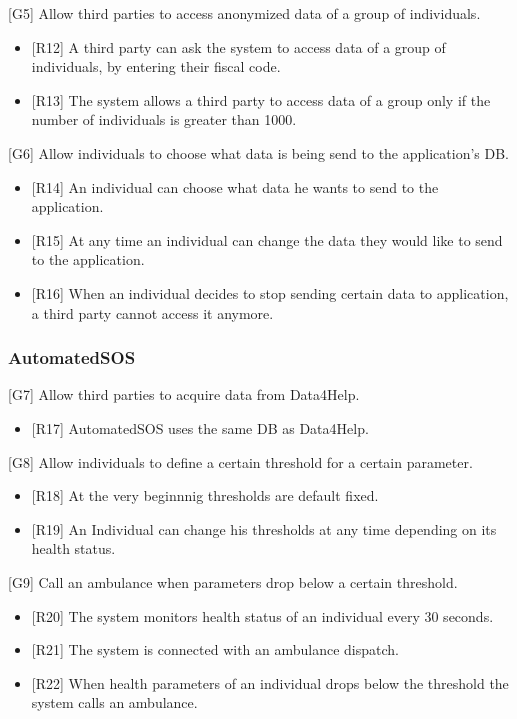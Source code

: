 \documentclass[12pt]{article}
\begin{document}
[G5] Allow third parties to access anonymized data of a group of individuals.\newline 
\begin{itemize}
    \item {[R12]} A third party can ask the system to access data of a group of individuals, by entering their fiscal code. 
    \item {[R13]} The system allows a third party to access data of a group only if the number of individuals is greater than 1000. 
\end{itemize}
[G6] Allow individuals to choose what data is being send to the application's DB.\newline 
\begin{itemize}
    \item {[R14]} An individual can choose what data he wants to send to the application.
    \item {[R15]} At any time an individual can change the data they would like to send to the application.
    \item {[R16]} When an individual decides to stop sending certain data to application, a third party cannot access it anymore.  
\end{itemize}
\subsubsection{AutomatedSOS}
[G7] Allow third parties to acquire data from Data4Help.\newline 
\begin{itemize} 
    \item {[R17]} AutomatedSOS uses the same DB as Data4Help.
\end{itemize}
[G8] Allow individuals to define a certain threshold for a certain parameter.\newline 
\begin{itemize}
    \item {[R18]} At the very beginnnig thresholds are default fixed.
    \item {[R19]} An Individual can change his thresholds at any time depending on its health status.  
\end{itemize}
[G9] Call an ambulance when parameters drop below a certain threshold.\newline
\begin{itemize}
    \item {[R20]} The system monitors health status of an individual every 30 seconds. 
    \item {[R21]} The system is connected with an ambulance dispatch.
    \item {[R22]} When health parameters of an individual drops below the threshold the system calls an ambulance.
\end{itemize}
\end{document}
